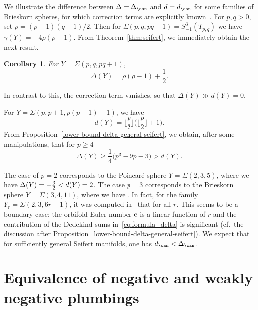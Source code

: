 \documentclass[10pt,a4paper]{amsart}
\newcounter{theorem}
\newtheorem{Corollary}[Theorem]{Corollary}
\begin{document}
We illustrate the difference between $\Delta = \Delta_{\can}$ and $d = d_{\can}$ for some families of Brieskorn spheres, for which correction terms are explicitly known~\cite{BorNem2011}. For $p, q > 0$, set $\rho = (p-1)(q-1)/2$. Then for $\Sigma(p, q, p q+1)= S^3_{-1}(T_{p, q})$ we have
$\gamma(Y) = -4\rho(\rho-1)$. From Theorem~\ref{thm:seifert}, we immediately obtain the next result.

\begin{Corollary}
 For $Y = \Sigma(p, q, pq+1)$,
 \begin{equation*}%
 \Delta(Y) = \rho(\rho-1) + \frac{1}{2}.
 \end{equation*}
\end{Corollary}
In contrast to this, the correction term vanishes, so that $\Delta(Y) \gg d(Y) = 0$.

For $Y = \Sigma(p, p+1, p(p+1)-1)$, we have
\begin{equation*}%
d(Y) = \biggl\lfloor \frac{p}{2} \biggr\rfloor\biggl(\biggl\lfloor \frac{p}{2} \biggr\rfloor+1\biggr).
\end{equation*}
From Proposition~\ref{lower-bound-delta-general-seifert}, we obtain, after some manipulations, that for $p\geq 4$
\begin{equation*}%
 \Delta(Y) \geq \frac{1}{4}\bigl(p^3-9p- 3 \bigr) > d(Y).
\end{equation*}

The case of $p = 2$ corresponds to the Poincar\'e sphere $Y = \Sigma(2, 3, 5)$, where we have $\Delta(Y) = \smash{-\frac{3}{2}} < d(Y) = 2$. The case $p = 3$ corresponds to the Brieskorn sphere $Y = \Sigma(3, 4, 11)$, where we have . In fact, for the family $Y_r = \Sigma(2, 3, 6r-1)$, it was computed in~\cite{GPP21} that  for all $r$. This seems to be a boundary case: the orbifold Euler number ${\rm e}$ is a linear function of $r$ and the contribution of the Dedekind sums in~\eqref{eq:formula_delta} is significant (cf.~the discussion after Proposition~\ref{lower-bound-delta-general-seifert}). We expect that for sufficiently general Seifert manifolds, one has
$d_{\can} < \Delta_{\can}$.

\appendix

\section{Equivalence of negative and weakly negative plumbings}
\end{document}

